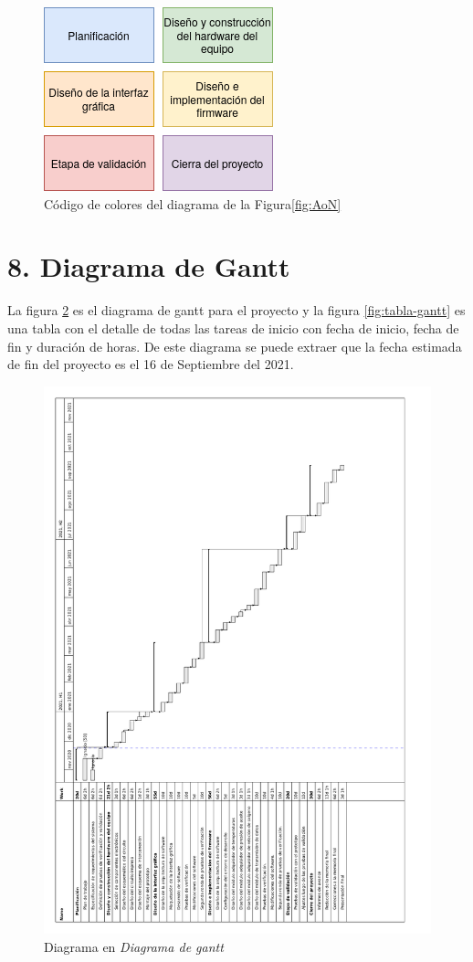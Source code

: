 \documentclass[11pt]{charter}
\begin{document}
\begin{figure}[htpb]
\centering 
\includegraphics[width=.3\textwidth]{./Figuras/leyenda.png}
\caption{Código de colores del diagrama de la Figura\ref{fig:AoN}}
\label{fig:leyenda-aon}
\end{figure}


\section{8. Diagrama de Gantt}
\label{sec:gantt}

La figura \ref{fig:diagrama-gantt} es el diagrama de gantt para el proyecto y la figura \ref{fig:tabla-gantt} es una tabla con el detalle de todas las tareas de inicio con fecha de inicio, fecha de fin y duración de horas. De este diagrama se puede extraer que la fecha estimada de fin del proyecto es el 16 de Septiembre del 2021.

\begin{figure}[htpb]
\centering 
\includegraphics[width=1.05\textwidth]{./Figuras/diagrama-gantt.pdf}
\caption{Diagrama en \textit{Diagrama de gantt}}
\label{fig:diagrama-gantt}
\end{figure}
\end{document}
